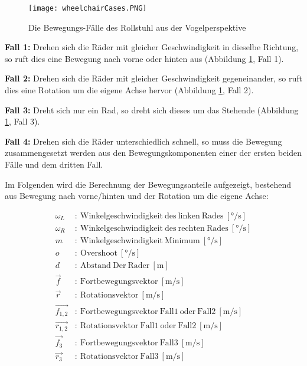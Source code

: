 \begin{figure}[h]
    \centering
    \texttt{[image: wheelchairCases.PNG]}
    \caption{Die Bewegungs-Fälle des Rollstuhl aus der Vogelperspektive}
    \label{fig:wheelchairCases}
\end{figure}

\textbf{Fall 1:} Drehen sich die Räder mit gleicher Geschwindigkeit in dieselbe Richtung, so ruft dies eine Bewegung nach vorne oder hinten aus (Abbildung \ref{fig:wheelchairCases}, Fall 1).

\textbf{Fall 2:} Drehen sich die Räder mit gleicher Geschwindigkeit gegeneinander, so ruft dies eine Rotation um die eigene Achse hervor (Abbildung \ref{fig:wheelchairCases}, Fall 2).

\textbf{Fall 3:} Dreht sich nur ein Rad, so dreht sich dieses um das Stehende (Abbildung \ref{fig:wheelchairCases}, Fall 3).

\textbf{Fall 4:} Drehen sich die Räder unterschiedlich schnell, so muss die Bewegung zusammengesetzt werden aus den Bewegungskomponenten einer der ersten beiden Fälle und dem dritten Fall.

Im Folgenden wird die Berechnung der Bewegungsanteile aufgezeigt, bestehend aus Bewegung nach vorne/hinten und der Rotation um die eigene Achse:

\begin{align}
    \omega_L      & : \ \mathrm{Winkelgeschwindigkeit\ des\ linken\ Rades}\ [\si{\degree/\second}]  \\
    \omega_R      & : \ \mathrm{Winkelgeschwindigkeit\ des\ rechten\ Rades}\ [\si{\degree/\second}] \\
    m             & : \ \mathrm{Winkelgeschwindigkeit\ Minimum}\ [\si{\degree/\second}]             \\
    o             & : \ \mathrm{Overshoot}\ [\si{\degree/\second}]                                  \\
    d             & : \ \mathrm{Abstand\ Der\ R\ddot{a}der}\ [\si{\metre}]                          \\
    \vec{f}       & : \ \mathrm{Fortbewegungsvektor}\ [\si{\metre/\second}]                         \\
    \vec{r}       & : \ \mathrm{Rotationsvektor}\ [\si{\metre/\second}]                             \\
    \vec{f_{1,2}} & : \ \mathrm{Fortbewegungsvektor\ Fall1\ oder\ Fall2}\ [\si{\metre/\second}]     \\
    \vec{r_{1,2}} & : \ \mathrm{Rotationsvektor\ Fall1\ oder\ Fall2}\ [\si{\metre/\second}]         \\
    \vec{f_{3}}   & : \ \mathrm{Fortbewegungsvektor\ Fall3}\ [\si{\metre/\second}]                  \\
    \vec{r_{3}}   & : \ \mathrm{Rotationsvektor\ Fall3}\ [\si{\metre/\second}]
\end{align}

